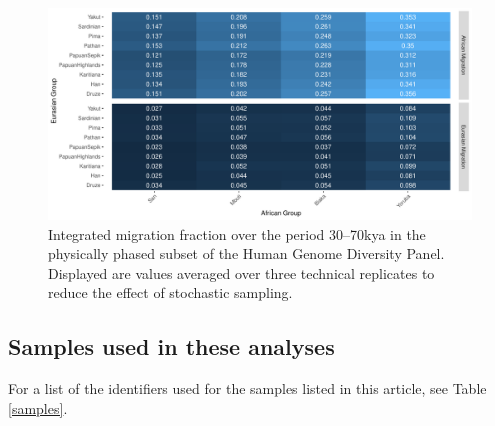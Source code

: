 \documentclass{article}
\begin{document}
\begin{figure}
    \centering
    \includegraphics[width = \textwidth]{plot/imf_hgdp.pdf}
    \caption{Integrated migration fraction over the period 30--70kya in the physically phased subset of the Human Genome Diversity Panel. Displayed are values averaged over three technical replicates to reduce the effect of stochastic sampling.}
    \label{fig:hgdp_imf}
\end{figure}

\subsection{Samples used in these analyses}

For a list of the identifiers used for the samples listed in this article, see Table \ref{samples}.
\end{document}
